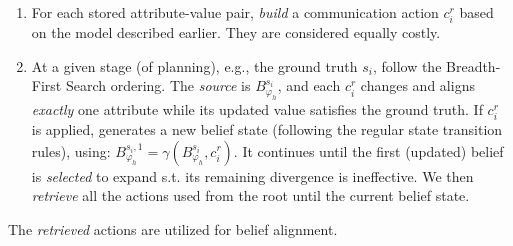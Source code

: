 \documentclass[letterpaper]{article} %
\newtheorem{theorem}{Theorem}[section]
\begin{document}
\begin{itemize}
\begin{enumerate}
        \item For each stored attribute-value pair, \textit{build} a communication action $c^r_i$ based on the model described earlier. They are considered equally costly.  
        \item 
         
        At a given stage (of planning), e.g., the ground truth $s_i$, follow the Breadth-First Search ordering. 
        The \textit{source} is $B_{\varphi_h}^{s_i}$, and each $c^r_i$ changes and aligns \textit{exactly} one attribute while its updated value satisfies the ground truth. If $c^r_i$ is applied, generates a new belief state (following the regular state transition rules), using: $B_{\varphi_h}^{s_i,1} = \gamma(B_{\varphi_h}^{s_i}, c^r_i)$.
        It continues until the first (updated) belief is \textit{selected} to expand s.t. its remaining divergence is ineffective. We then \textit{retrieve} all the actions used from the root until the current belief state.   
    \end{enumerate}

\end{itemize}



The \textit{retrieved}  actions are utilized for belief alignment. 



\end{document}
